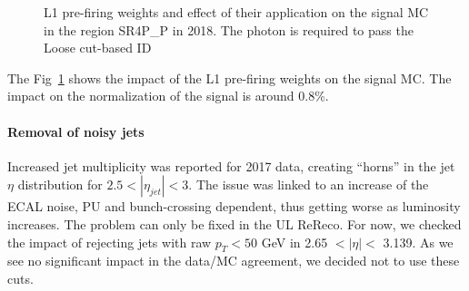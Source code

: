 \begin{figure}
\caption{L1 pre-firing weights and effect of their application on the signal MC in the region SR4P\_P in 2018. The photon is required to pass the Loose cut-based ID}
\label{fig:L1Prefiring}
\end{figure}

The Fig~\ref{fig:L1Prefiring} shows the impact of the L1 pre-firing weights on the signal MC.
The impact on the normalization of the signal is around 0.8\%.

\paragraph{Removal of noisy jets}

Increased jet multiplicity was reported for 2017 data, creating ``horns'' in the jet $\eta$ distribution for $2.5<|\eta_{jet}|<3$.
The issue was linked to an increase of the ECAL noise, PU and bunch-crossing dependent, thus getting worse as luminosity increases.
The problem can only be fixed in the UL ReReco.
For now, we checked the impact of rejecting jets with raw $p_T<50$ GeV in 2.65 $<|\eta| <$ 3.139.
As we see no significant impact in the data/MC agreement, we decided not to use these cuts.







